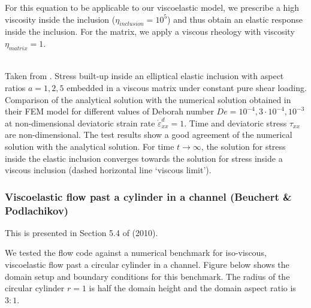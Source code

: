 For this equation to be applicable to our viscoelastic model, we prescribe a
high viscosity inside the inclusion ($\eta_{inclusion}=10^5$) and thus obtain an 
elastic response inside the inclusion. For the matrix, we apply a viscous
rheology with viscosity $\eta_{matrix} =1$.

\begin{center}
\\
{\captionfont Taken from \textcite{bepo10}.
Stress built-up inside an elliptical elastic inclusion with aspect ratios 
$a =1,2,5$ embedded in a viscous matrix under constant pure shear
loading. Comparison of the analytical solution 
with the numerical solution obtained in their FEM model for different values 
of Deborah number $De = 10^{-4},3\cdot10^{-4},10^{-3}$ 
at non-dimensional deviatoric strain rate $\dot\varepsilon_{xx}^d=1$. 
Time and deviatoric stress $\tau_{xx}$are non-dimensional.
The test results show a good agreement of the numerical solution with the 
analytical solution. For time $t\rightarrow \infty$, the solution for
stress inside the elastic inclusion converges towards the solution for stress 
inside a viscous inclusion (dashed horizontal line ‘viscous limit’).
}
\end{center}


\subsubsection{Viscoelastic flow past a cylinder in a channel (Beuchert \& Podlachikov)}

This is presented in Section 5.4 of \textcite{bepo10} (2010).

We tested the flow code against a numerical benchmark for iso-viscous, 
viscoelastic flow past a circular cylinder in a channel. Figure below shows
the domain setup and boundary conditions for this benchmark. The radius of the circular 
cylinder $r=1$ is half the domain height and the
domain aspect ratio is $3:1$. 


